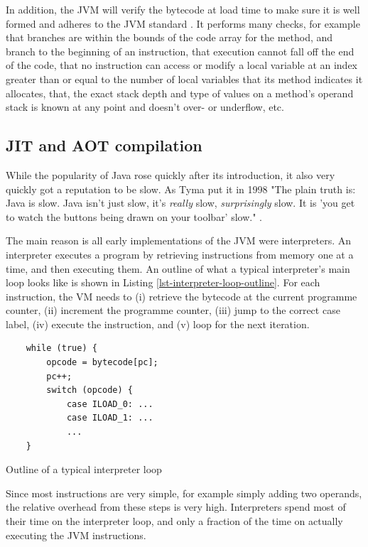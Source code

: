 In addition, the JVM will verify the bytecode at load time to make sure it is well formed and adheres to the JVM standard \cite{Lindholm:2017vu}. It performs many checks, for example that branches are within the bounds of the code array for the method, and branch to the beginning of an instruction, that execution cannot fall off the end of the code, that no instruction can access or modify a local variable at an index greater than or equal to the number of local variables that its method indicates it allocates, that, the exact stack depth and type of values on a method's operand stack is known at any point and doesn't over- or underflow, etc.

\subsection{JIT and AOT compilation}
While the popularity of Java rose quickly after its introduction, it also very quickly got a reputation to be slow. As Tyma put it in 1998 "The plain truth is: Java is slow. Java isn't just slow, it's \emph{really} slow, \emph{surprisingly} slow. It is 'you get to watch the buttons being drawn on your toolbar' slow." \cite{Tyma:1998vj}.

The main reason is all early implementations of the JVM were interpreters. An interpreter executes a program by retrieving instructions from memory one at a time, and then executing them. An outline of what a typical interpreter's main loop looks like is shown in Listing \ref{lst-interpreter-loop-outline}. For each instruction, the VM needs to (i) retrieve the bytecode at the current programme counter, (ii) increment the programme counter, (iii) jump to the correct case label, (iv) execute the instruction, and (v) loop for the next iteration.

\begin{listing}
    \centering
    \begin{verbatim}
    while (true) {
        opcode = bytecode[pc];
        pc++;
        switch (opcode) {
            case ILOAD_0: ...
            case ILOAD_1: ...
            ...
    }
    \end{verbatim}
\caption{Outline of a typical interpreter loop}
\label{lst-interpreter-loop-outline}
\end{listing}

Since most instructions are very simple, for example simply adding two operands, the relative overhead from these steps is very high. Interpreters spend most of their time on the interpreter loop, and only a fraction of the time on actually executing the JVM instructions.

